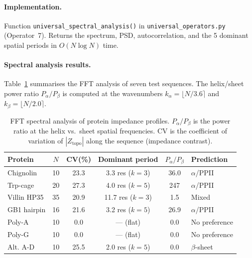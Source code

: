 \paragraph{Implementation.}
Function \texttt{universal\_spectral\_analysis()} in
\texttt{universal\_operators.py} (Operator~7). Returns the spectrum,
PSD, autocorrelation, and the 5 dominant spatial periods in
$O(N \log N)$ time.

\paragraph{Spectral analysis results.}
Table~\ref{tab:fft_results} summarises the FFT analysis of seven
test sequences.  The helix/sheet power ratio $P_\alpha / P_\beta$
is computed at the wavenumbers $k_\alpha = \lfloor N/3.6 \rceil$
and $k_\beta = \lfloor N/2.0 \rceil$.

\begin{table}[H]
\centering
\caption{FFT spectral analysis of protein impedance profiles.
$P_\alpha/P_\beta$ is the power ratio at the helix vs.\ sheet
spatial frequencies.  CV is the coefficient of variation of
$|Z_\text{topo}|$ along the sequence (impedance contrast).}
\label{tab:fft_results}
\small
\begin{tabular}{@{}l c c c c l@{}}
\toprule
\textbf{Protein} & $N$ & \textbf{CV(\%)} & \textbf{Dominant period} & $P_\alpha/P_\beta$ & \textbf{Prediction} \\
\midrule
Chignolin    & 10 & 23.3 & 3.3 res ($k\!=\!3$) & 36.0 & $\alpha$/PPII \\
Trp-cage     & 20 & 27.3 & 4.0 res ($k\!=\!5$) & 247  & $\alpha$/PPII \\
Villin HP35  & 35 & 20.9 & 11.7 res ($k\!=\!3$) & 1.5  & Mixed \\
GB1 hairpin  & 16 & 21.6 & 3.2 res ($k\!=\!5$) & 26.9 & $\alpha$/PPII \\
Poly-A       & 10 & 0.0  & --- (flat)          & 0.0  & No preference \\
Poly-G       & 10 & 0.0  & --- (flat)          & 0.0  & No preference \\
Alt. A-D     & 10 & 25.5 & 2.0 res ($k\!=\!5$) & 0.0  & $\beta$-sheet \\
\bottomrule
\end{tabular}
\end{table}


